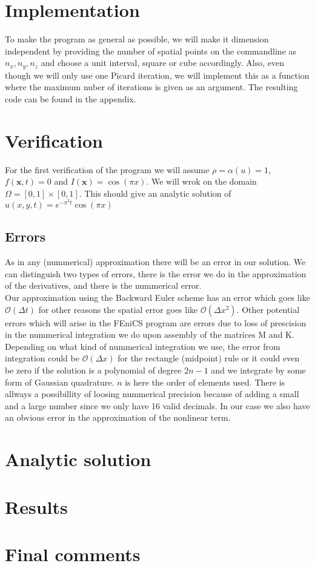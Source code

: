 \documentclass[a4paper,english, 10pt, twoside]{article}
\begin{document}
\section*{Implementation}
To make the program as general as possible, we will make it dimension independent by providing the number of spatial points on the commandline 
as $n_x, n_y, n_z$ and choose a unit interval, square or cube accordingly. Also, even though we will only use one Picard iteration, we will 
implement this as a function where the maximum nuber of iterations is given as an argument. The resulting code can be found in the appendix.

\section*{Verification}
For the first verification of the program we will assume $\rho = \alpha(u) = 1$, $f(\mathbf{x},t) = 0$ and $I(\mathbf{x}) = \cos(\pi x)$. We 
will wrok on the domain $\Omega = [0,1]\times[0,1]$. This should give an analytic solution of $u(x,y,t) = e^{-\pi^2t}\cos(\pi x)$

\subsection*{Errors}
As in any (nummerical) approximation there will be an error in our solution. We can distinguish two types of errors, there is the error we do in 
the approximation of the derivatives, and there is the nummerical error.\\
Our approximation using the Backward Euler scheme has an error which goes like $\mathcal{O}(\Delta t)$ for other reasons the spatial error goes 
like $\mathcal{O}(\Delta x^2)$. Other potential errors which will arise in the FEniCS program are errors due to loss of prescision in the 
nummerical integration we do upon assembly of the matrices M and K. Depending on what kind of nummerical integration we use, the error from integration 
could be $\mathcal{O}(\Delta x)$ for the rectangle (midpoint) rule or it could even be zero if the solution is a polynomial of degree $2n-1$ 
and we integrate by some form of Gaussian quadrature. $n$ is here the order of elements used.
There is allways a possibillity of loosing nummerical precision because of adding a small and a large number since we only have 16 valid decimals.
In our case we also have an obvious error in the approximation of the nonlinear term. 
\section*{Analytic solution}

\section*{Results}

\section*{Final comments}
\end{document}
